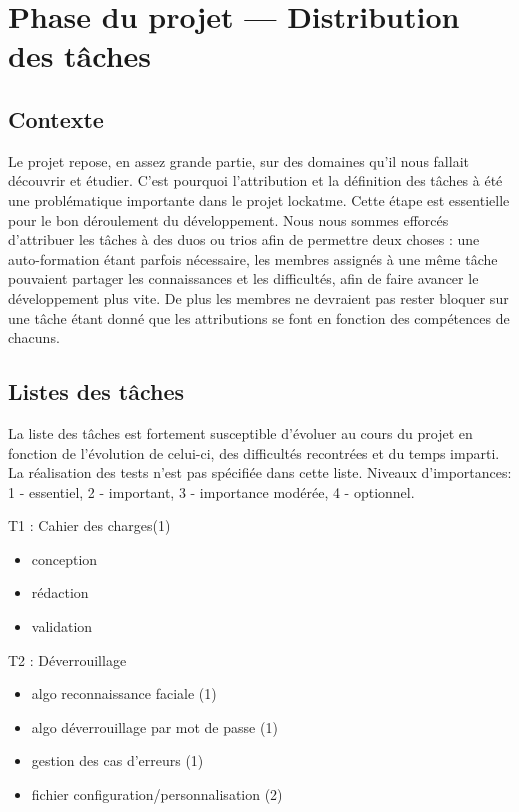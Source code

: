 \chapter{Phase du projet --- Distribution des tâches}
\newpage

\section{Contexte}
Le projet repose, en assez grande partie, sur des domaines qu’il nous
fallait découvrir et étudier. C’est pourquoi l’attribution et la définition
des tâches à été une problématique importante dans le projet lockatme.
Cette étape est essentielle pour le bon déroulement du développement.
Nous nous sommes efforcés d’attribuer les tâches à des duos ou trios afin de
permettre deux choses : une auto-formation étant parfois nécessaire, les
membres assignés à une même tâche pouvaient partager les connaissances et les
difficultés, afin de faire avancer le développement plus vite. De plus les
membres ne devraient pas rester bloquer sur une tâche étant donné que les
attributions se font en fonction des compétences de chacuns.

\section{Listes des tâches}
La liste des tâches est fortement susceptible d’évoluer au cours du projet en
fonction de l’évolution de celui-ci, des difficultés recontrées et du temps
imparti. La réalisation des tests n’est pas spécifiée dans cette liste.
Niveaux d’importances: 1 - essentiel, 2 - important, 3 - importance modérée,
4 - optionnel.

\vspace{0.5cm}

T1 : Cahier des charges(1)
\begin{itemize}
  \item{conception}
  \item{rédaction}
  \item{validation}
\end{itemize}

T2 : Déverrouillage
\begin{itemize}
  \item{algo reconnaissance faciale (1)}
  \item{algo déverrouillage par mot de passe (1)}
  \item{gestion des cas d’erreurs (1)}
  \item{fichier configuration/personnalisation (2)}
\end{itemize}

